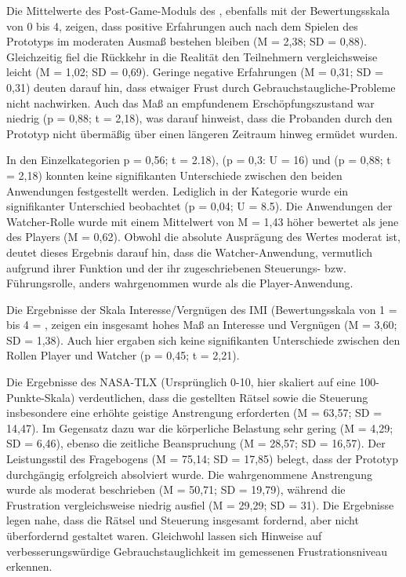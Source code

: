 Die Mittelwerte des Post-Game-Moduls des , ebenfalls mit der Bewertungsskala von 0 bis 4, zeigen, dass positive Erfahrungen auch nach dem Spielen des Prototyps im moderaten Ausmaß bestehen bleiben (M = 2,38; SD = 0,88). Gleichzeitig fiel die Rückkehr in die Realität den Teilnehmern vergleichsweise leicht (M = 1,02; SD = 0,69). Geringe negative Erfahrungen (M = 0,31; SD = 0,31) deuten darauf hin, dass etwaiger Frust durch Gebrauchstaugliche-Probleme nicht nachwirken. Auch das Maß an empfundenem Erschöpfungszustand war niedrig (p = 0,88; t = 2,18), was darauf hinweist, dass die Probanden durch den Prototyp nicht übermäßig über einen längeren Zeitraum hinweg ermüdet wurden.

In den Einzelkategorien  p = 0,56; t = 2.18),  (p = 0,3: U = 16) und  (p = 0,88; t = 2,18) konnten keine signifikanten Unterschiede zwischen den beiden Anwendungen festgestellt werden. Lediglich in der Kategorie  wurde ein signifikanter Unterschied beobachtet (p = 0,04; U = 8.5). Die Anwendungen der Watcher-Rolle wurde mit einem Mittelwert von M = 1,43 höher bewertet als jene des Players (M = 0,62). Obwohl die absolute Ausprägung des Wertes moderat ist, deutet dieses Ergebnis darauf hin, dass die Watcher-Anwendung, vermutlich aufgrund ihrer Funktion und der ihr zugeschriebenen Steuerungs- bzw. Führungsrolle, anders wahrgenommen wurde als die Player-Anwendung.

Die Ergebnisse der Skala Interesse/Vergnügen des \ac{IMI} (Bewertungsskala von 1 =  bis 4 = , zeigen ein insgesamt hohes Maß an Interesse und Vergnügen (M = 3,60; SD = 1,38). Auch hier ergaben sich keine signifikanten Unterschiede zwischen den Rollen Player und Watcher (p = 0,45; t = 2,21). 

Die Ergebnisse des \ac{NASA-TLX} (Ursprünglich 0-10, hier skaliert auf eine 100-Punkte-Skala) verdeutlichen, dass die gestellten Rätsel sowie die Steuerung insbesondere eine erhöhte geistige Anstrengung erforderten (M = 63,57; SD = 14,47). Im Gegensatz dazu war die körperliche Belastung sehr gering  (M = 4,29; SD = 6,46), ebenso die zeitliche Beanspruchung (M = 28,57; SD = 16,57). Der Leistungsstil des Fragebogens (M = 75,14; SD = 17,85) belegt, dass der Prototyp durchgängig erfolgreich absolviert wurde. Die wahrgenommene Anstrengung wurde als moderat beschrieben (M = 50,71; SD = 19,79),  während die Frustration vergleichsweise niedrig ausfiel  (M = 29,29; SD = 31). Die Ergebnisse legen nahe, dass die Rätsel und Steuerung insgesamt fordernd, aber nicht überfordernd gestaltet waren. Gleichwohl lassen sich Hinweise auf verbesserungswürdige Gebrauchstauglichkeit im gemessenen Frustrationsniveau erkennen.

